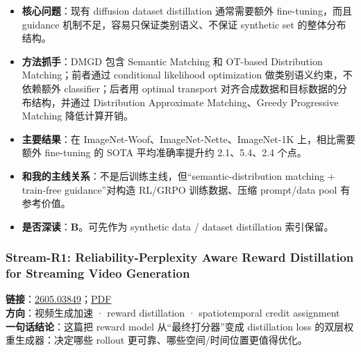 \begin{itemize}[leftmargin=1.5em]
  \item \textbf{核心问题}：现有 diffusion dataset distillation 通常需要额外 fine-tuning，而且 guidance 机制不足，容易只保证类别语义、不保证 synthetic set 的整体分布结构。
  \item \textbf{方法抓手}：DMGD 包含 Semantic Matching 和 OT-based Distribution Matching；前者通过 conditional likelihood optimization 做类别语义约束，不依赖额外 classifier；后者用 optimal transport 对齐合成数据和目标数据的分布结构，并通过 Distribution Approximate Matching、Greedy Progressive Matching 降低计算开销。
  \item \textbf{主要结果}：在 ImageNet-Woof、ImageNet-Nette、ImageNet-1K 上，相比需要额外 fine-tuning 的 SOTA 平均准确率提升约 2.1、5.4、2.4 个点。
  \item \textbf{和我的主线关系}：不是后训练主线，但“semantic-distribution matching + train-free guidance”对构造 RL/GRPO 训练数据、压缩 prompt/data pool 有参考价值。
  \item \textbf{是否深读}：\textbf{B}。可先作为 synthetic data / dataset distillation 索引保留。
\end{itemize}

\subsubsection{Stream-R1: Reliability-Perplexity Aware Reward Distillation for Streaming Video Generation}

\textbf{链接}：\href{https://arxiv.org/abs/2605.03849}{2605.03849}；\href{https://arxiv.org/pdf/2605.03849}{PDF}\\
\textbf{方向}：视频生成加速 · reward distillation · spatiotemporal credit assignment\\
\textbf{一句话结论}：这篇把 reward model 从“最终打分器”变成 distillation loss 的双层权重生成器：决定哪些 rollout 更可靠、哪些空间/时间位置更值得优化。

